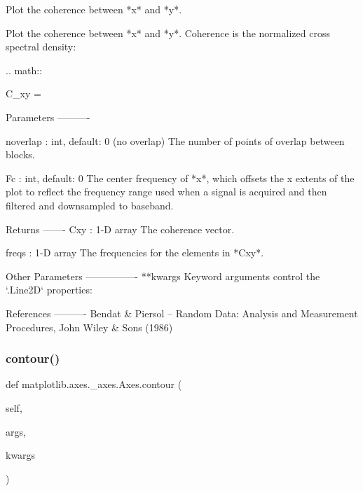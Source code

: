 \begin{DoxyVerb}Plot the coherence between *x* and *y*.

Plot the coherence between *x* and *y*.  Coherence is the
normalized cross spectral density:

.. math::

  C_{xy} = 

Parameters
----------


noverlap : int, default: 0 (no overlap)
    The number of points of overlap between blocks.

Fc : int, default: 0
    The center frequency of *x*, which offsets the x extents of the
    plot to reflect the frequency range used when a signal is acquired
    and then filtered and downsampled to baseband.

Returns
-------
Cxy : 1-D array
    The coherence vector.

freqs : 1-D array
    The frequencies for the elements in *Cxy*.

Other Parameters
----------------
**kwargs
    Keyword arguments control the `.Line2D` properties:


References
----------
Bendat & Piersol -- Random Data: Analysis and Measurement Procedures,
John Wiley & Sons (1986)
\end{DoxyVerb}
 \mbox{\label{classmatplotlib_1_1axes_1_1__axes_1_1Axes_aff19cf5d64d00477605cb6c37aa20c73}} 
\subsubsection{\texorpdfstring{contour()}{contour()}}
{\footnotesize\ttfamily def matplotlib.\+axes.\+\_\+axes.\+Axes.\+contour (\begin{DoxyParamCaption}\item[{}]{self,  }\item[{}]{args,  }\item[{}]{kwargs }\end{DoxyParamCaption})}

\mbox{\label{classmatplotlib_1_1axes_1_1__axes_1_1Axes_af6a6bc1ccaa0284c1819fedcccd5adad}} 
